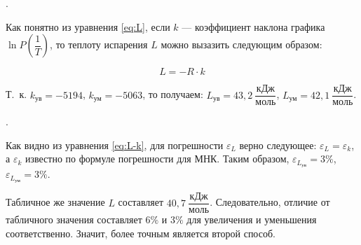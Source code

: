 \documentclass[a4paper, 12pt]{article}
\newcommand{\eps}{\varepsilon}
\newcounter{Points}
\newcommand{\point}{\arabic{Points}. \addtocounter{Points}{1}}
\begin{document}
\point Как понятно из уравнения \eqref{eq:L}, если $k$ --- коэффициент наклона графика $\ln P \left(\dfrac{1}{T} \right)$, то теплоту испарения $L$ можно вызазить следующим образом:

\begin{equation} \label{eq:L-k}
    L = -R \cdot k
\end{equation}

Т.~к. $k_{\text{ув}} = -5194$, $k_{\text{ум}} = -5063$, то получаем: $L_{\text{ув}} = 43,2  ~\dfrac{\text{кДж}}{\text{моль}}$, $L_{\text{ум}} = 42,1 ~\dfrac{\text{кДж}}{\text{моль}}$.

\vspace{0.5cm}

\point Как видно из уравнения \eqref{eq:L-k}, для погрешности $\eps_L$ верно следующее: $\eps_L = \eps_k$, а $\eps_k$ известно по формуле погрешности для МНК. Таким образом, $\eps_{L_{\text{ув}}} = 3\%$, $\eps_{L_{\text{ум}}} = 3\%$.

Табличное же значение $L$ составляет $40,7 ~\dfrac{\text{кДж}}{\text{моль}}$. Следовательно, отличие от табличного значения составляет $6\%$ и $3\%$ для увеличения и уменьшения соответственно. Значит, более точным является второй способ.
\end{document}
